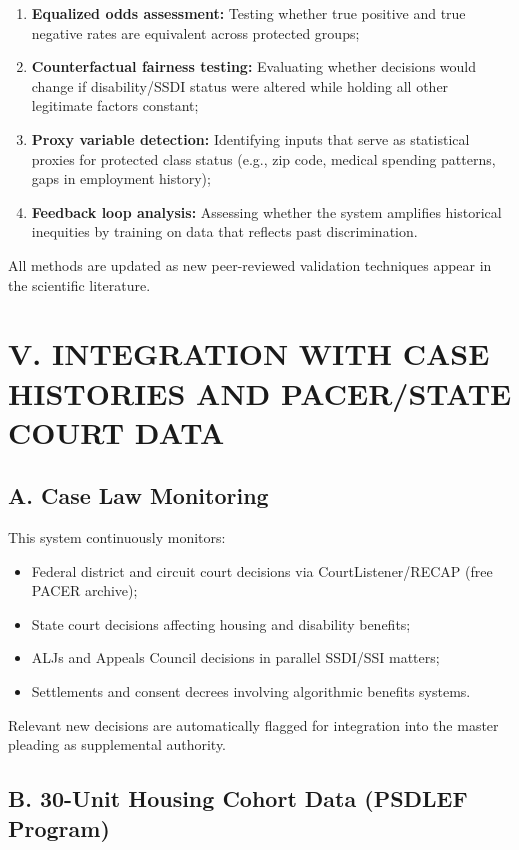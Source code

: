 \documentclass[12pt,letterpaper]{article}
\begin{document}
\begin{singlespacing}
\begin{enumerate}
    \item \textbf{Equalized odds assessment:} Testing whether true positive and true negative rates are equivalent across protected groups;

    \item \textbf{Counterfactual fairness testing:} Evaluating whether decisions would change if disability/SSDI status were altered while holding all other legitimate factors constant;

    \item \textbf{Proxy variable detection:} Identifying inputs that serve as statistical proxies for protected class status (e.g., zip code, medical spending patterns, gaps in employment history);

    \item \textbf{Feedback loop analysis:} Assessing whether the system amplifies historical inequities by training on data that reflects past discrimination.
\end{enumerate}

All methods are updated as new peer-reviewed validation techniques appear in the scientific literature.

\section*{V. INTEGRATION WITH CASE HISTORIES AND PACER/STATE COURT DATA}

\subsection*{A. Case Law Monitoring}

This system continuously monitors:
\begin{itemize}
    \item Federal district and circuit court decisions via CourtListener/RECAP (free PACER archive);
    \item State court decisions affecting housing and disability benefits;
    \item ALJs and Appeals Council decisions in parallel SSDI/SSI matters;
    \item Settlements and consent decrees involving algorithmic benefits systems.
\end{itemize}

Relevant new decisions are automatically flagged for integration into the master pleading as supplemental authority.

\subsection*{B. 30-Unit Housing Cohort Data (PSDLEF Program)}


\end{singlespacing}
\end{document}
